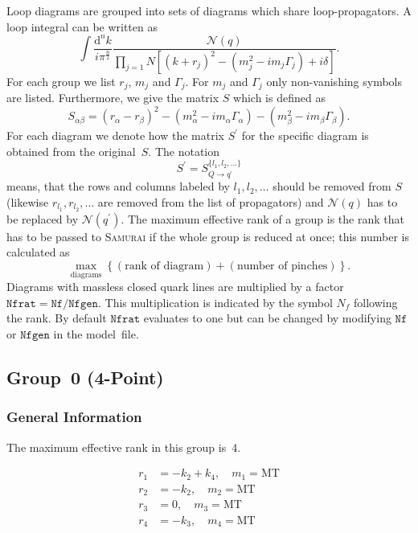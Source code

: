 \documentclass[a4paper]{article}
\begin{document}
Loop diagrams are grouped into sets of diagrams which share
loop-propagators. A loop integral can be written as
\begin{equation}
\int\!\frac{\mathrm{d}^nk}{i\pi^{\frac{n}{2}}}%
\frac{\mathcal{N}(q)}{\prod_{j=1}{N}\left[(k+r_j)^2-(m_j^2
   -i m_j\Gamma_j) + i\delta\right]}.
\end{equation}
For each group we list $r_j$, $m_j$ and $\Gamma_j$.
For $m_j$ and $\Gamma_j$ only non-vanishing symbols are listed.
Furthermore, we give the matrix $S$ which is defined as
\begin{equation}
S_{\alpha\beta} = (r_\alpha-r_\beta)^2
-(m_\alpha^2-im_\alpha\Gamma_\alpha)
-(m_\beta^2-im_\beta\Gamma_\beta).
\end{equation}
For each diagram we denote how the matrix $S^\prime$ for the specific diagram
is obtained from the original~$S$. The notation
\begin{equation}
S^\prime=S_{Q\to q^\prime}^{\{l_1,l_2,\ldots\}}
\end{equation}
means, that the rows and columns labeled by $l_1,l_2,\ldots$ should be
removed from $S$ (likewise $r_{l_1}, r_{l_2}, \ldots$ are removed from the
list of propagators) and $\mathcal{N}(q)$ has to be replaced by
$\mathcal{N}(q^\prime)$.
The maximum effective rank of a group is the rank that has to be passed
to \textsc{Samurai} if the whole group is reduced at once; this number
is calculated as
\begin{equation}
\max_{\text{diagrams}}\left\{(\text{rank of diagram})+
(\text{number of pinches})\right\}.
\end{equation}
Diagrams with massless closed quark lines are multiplied by a factor
$\mathtt{Nfrat}=\mathtt{Nf}/\mathtt{Nfgen}$. This multiplication is indicated
by the symbol $N_f$ following the rank. By default $\mathtt{Nfrat}$ evaluates
to one but can be changed by modifying $\mathtt{Nf}$ or $\mathtt{Nfgen}$ in the
model~file.


\subsection{Group~0 (4-Point)}
\subsubsection*{General Information}
The maximum effective rank in this group is~4.

\begin{subequations}
\begin{align}
r_{1} &= -k_{2}+k_{4},\quad m_{1} = \text{MT}\\
r_{2} &= -k_{2},\quad m_{2} = \text{MT}\\
r_{3} &= 0,\quad m_{3} = \text{MT}\\
r_{4} &= -k_{3},\quad m_{4} = \text{MT}
\end{align}
\end{subequations}
\end{document}
